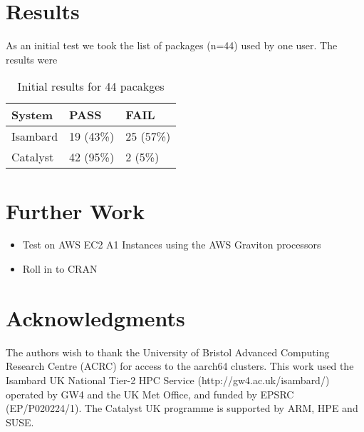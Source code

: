 \section{Results}

As an initial test we took the list of packages (n=44) used by one user. The results were

\begin{table}[h]
\begin{tabular}{lll}
\hline
System & PASS & FAIL \\ \hline
Isambard & 19 (43\%) & 25 (57\%) \\
Catalyst & 42 (95\%) & 2 (5\%) \\ \hline
\end{tabular}
\caption{Initial results for 44 pacakges}
\label{tab:results-one-user}
\end{table}

\section{Further Work}

\begin{itemize}
    \item Test on AWS EC2 A1 Instances using the AWS Graviton processors
    \item Roll in to CRAN
\end{itemize}

\section{Acknowledgments}

The authors wish to thank the University of Bristol Advanced Computing
Research Centre (\textsc{ACRC}) for access to the aarch64 clusters. This
work used the Isambard UK National Tier-2 HPC Service
(http://gw4.ac.uk/isambard/) operated by GW4 and the UK Met Office, and
funded by EPSRC (EP/P020224/1). The Catalyst UK programme is supported by
ARM, HPE and SUSE.



\address{Christopher Edsall\\
  University of Bristol\\
  31 Great George Street\\
  Bristol\\
  BS1 5QD\\
  United Kingdom\\
  ORCiD: 0000-0001-6863-2184\\
  }

\address{Ainsley Rutterford\\
  University of Bristol\\
  31 Great George Street\\
  Bristol\\
  BS1 5QD\\
  United Kingdom\\
  (ORCiD if desired)\\
  }
